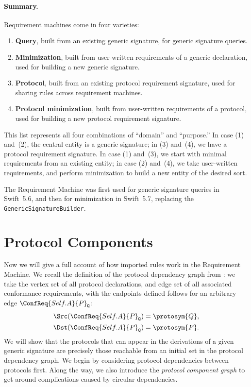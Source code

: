 \documentclass[../generics]{subfiles}
\begin{document}
\paragraph{Summary.}
Requirement machines come in four varieties:
\begin{enumerate}
\item \textbf{Query}, built from an existing generic signature, for generic signature queries.
\item \textbf{Minimization}, built from user-written requirements of a generic declaration, used for building a new generic signature.
\item \textbf{Protocol}, built from an existing protocol requirement signature, used for sharing rules across requirement machines.
\item \textbf{Protocol minimization}, built from user-written requirements of a protocol, used for building a new protocol requirement signature.
\end{enumerate}

This list represents all four combinations of ``domain'' and ``purpose.'' In case (1) and~(2), the central entity is a generic signature; in (3) and~(4), we have a protocol requirement signature. In case (1) and~(3), we start with minimal requirements from an existing entity; in case (2) and~(4), we take user-written requirements, and perform minimization to build a new entity of the desired sort.

The Requirement Machine was first used for generic signature queries in Swift~5.6, and then for minimization in Swift~5.7, replacing the \texttt{GenericSignatureBuilder}.

\section{Protocol Components}\label{protocol component}

Now we will give a full account of how imported rules work in the Requirement Machine. We recall the definition of the protocol dependency graph from : we take the vertex set of all protocol declarations, and edge set of all associated conformance requirements, with the endpoints defined follows for an arbitrary edge $\ConfReq{Self.A}{P}_\texttt{Q}$:
\begin{align*}
\Src(\ConfReq{Self.A}{P}_\texttt{Q})&=\protosym{Q},\\
\Dst(\ConfReq{Self.A}{P}_\texttt{Q})&=\protosym{P}.
\end{align*}
We will show that the protocols that can appear in the derivations of a given generic signature are precisely those reachable from an initial set in the protocol dependency graph. We begin by considering protocol dependencies between protocols first. Along the way, we also introduce the \emph{protocol component graph} to get around complications caused by circular dependencies.
\end{document}

